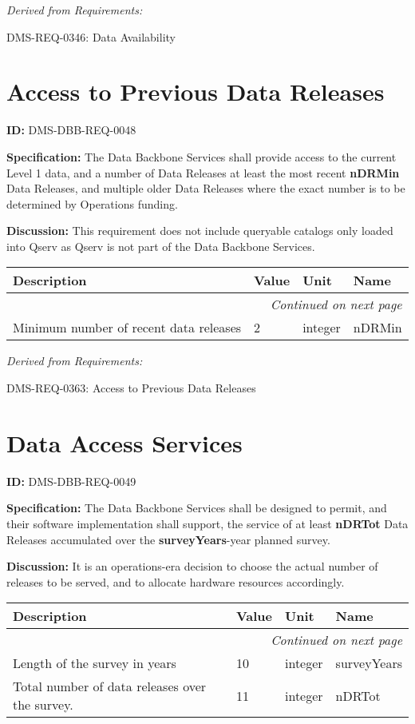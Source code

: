 \documentclass[SE,toc,lsstdraft]{lsstdoc}
\makeatletter
\newcommand{\paramname}[1]{\hspace{0pt}#1}
\newcommand{\unitname}[1]{\hspace{0pt}#1}
\newenvironment{parameters}[0]{%
\setlength\LTleft{0pt}
\setlength\LTright{\fill}
\begin{small}
\begin{longtable}[]{|p{0.49\textwidth}|l|p{0.6in}|p{1.70in}@{}|}

\hline \textbf{Description} & \textbf{Value} & \textbf{Unit} & \textbf{Name} \\ \hline
\endhead

\hline \multicolumn{4}{r}{\emph{Continued on next page}} \\
\endfoot

\hline\hline
\endlastfoot
}{%
\hline
\end{longtable}
\end{small}
}
\makeatother
\begin{document}
\emph{Derived from Requirements:}

DMS-REQ-0346:
Data Availability \newline

\section{Access to Previous Data Releases}

\label{DMS-DBB-REQ-0048}
\textbf{ID:} DMS-DBB-REQ-0048

\textbf{Specification:}
The Data Backbone Services shall provide access to the current Level 1 data, and a number of Data Releases at least the most recent \textbf{nDRMin} Data Releases, and multiple older Data Releases where the exact number is to be determined by Operations funding.

\textbf{Discussion:}
This requirement does not include queryable catalogs only loaded into Qserv as Qserv is not part of the Data Backbone Services.

\begin{parameters}
Minimum number of recent data releases
&
2
&
\unitname{%
integer
}
&
\paramname{%
nDRMin
} \\\hline
\end{parameters}

\emph{Derived from Requirements:}

DMS-REQ-0363:
Access to Previous Data Releases \newline

\section{Data Access Services}

\label{DMS-DBB-REQ-0049}
\textbf{ID:} DMS-DBB-REQ-0049

\textbf{Specification:}
The Data Backbone Services shall be designed to permit, and their software implementation shall support, the service of at least \textbf{nDRTot} Data Releases accumulated over the \textbf{surveyYears}-year planned survey.

\textbf{Discussion:}
It is an operations-era decision to choose the actual number of releases to be served, and to allocate hardware resources accordingly.

\begin{parameters}
Length of the survey in years
&
10
&
\unitname{%
integer
}
&
\paramname{%
surveyYears
} \\\hline
Total number of data releases over the survey.
&
11
&
\unitname{%
integer
}
&
\paramname{%
nDRTot
} \\\hline
\end{parameters}
\end{document}
